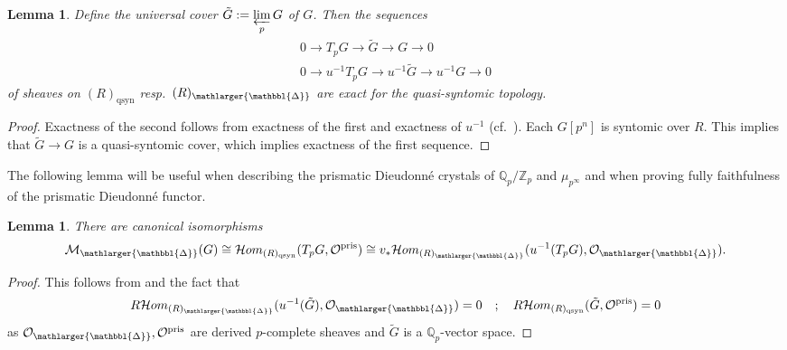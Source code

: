 \documentclass{amsart}
\newcommand{\prism}{{\mathlarger{\mathbbl{\Delta}}}}
\theoremstyle{plain}
\newtheorem{lemma}[theorem]{Lemma}
\theoremstyle{definition}
\newcommand{\pris}{\mathrm{pris}}
\newcommand{\Q}{\mathbb{Q}}
\newcommand{\Z}{\mathbb{Z}}
\begin{document}
\begin{lemma}
  \label{sec:divid-prism-dieud-lemma-exactness-of-universal-covering-exact-sequence} Define the universal cover $\tilde{G}:=\varprojlim\limits_{p} G$ of $G$. Then the sequences
  $$
  \begin{matrix}
    0\to T_pG\to \tilde{G}\to G\to 0\\
    0\to u^{-1} T_pG\to u^{-1} \tilde{G}\to u^{-1} G\to 0    
  \end{matrix}
  $$
  of sheaves on $(R)_{\mathrm{qsyn}}$ resp.\ $(R)_\prism$ are exact for the quasi-syntomic topology.
\end{lemma}
\begin{proof}
  Exactness of the second follows from exactness of the first and exactness of $u^{-1}$ (cf.\ ). Each $G[p^n]$ is syntomic over $R$. This implies that $\tilde{G}\to G$ is a quasi-syntomic cover, which implies exactness of the first sequence.
\end{proof}


The following lemma will be useful when describing the prismatic Dieudonn\'e crystals of $\Q_p/\Z_p$ and $\mu_{p^\infty}$ and when proving fully faithfulness of the prismatic Dieudonn\'e functor.

\begin{lemma}
  \label{sec:divid-prism-dieud-lemma-prismatic-dieudonne-module-via-hom}
  There are canonical isomorphisms
  $$
  \mathcal{M}_{\prism}(G)\cong \mathcal{H}om_{(R)_\mathrm{qsyn}}(T_pG,\mathcal{O}^\pris) \cong v_*\mathcal{H}om_{(R)_\prism}(u^{-1}(T_pG),\mathcal{O}_\prism).
  $$
\end{lemma}
\begin{proof}
  This follows from  and the fact that
  $$
  R\mathcal{H}om_{(R)_{\prism}}(u^{-1}(\tilde{G}),\mathcal{O}_\prism)=0 \quad ; \quad
  R\mathcal{H}om_{(R)_{\mathrm{qsyn}}}(\tilde{G},\mathcal{O}^\pris)=0
  $$ as $\mathcal{O}_{\prism}, \mathcal{O}^\pris$ are derived $p$-complete sheaves and $\tilde{G}$ is a $\Q_p$-vector space. 
  \end{proof}
\end{document}

